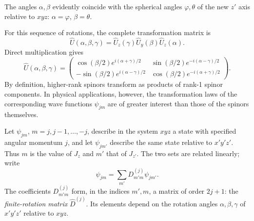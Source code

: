 \begin{figure}[ht]
\par{}
\end{figure}

The angles $\alpha,\beta$ evidently coincide with the spherical angles $\varphi,\theta$ of the new $z'$ axis relative to $xyz$: $\alpha=\varphi$, $\beta=\theta$.

For this sequence of rotations, the complete transformation matrix is
\[
 \hat U(\alpha,\beta,\gamma)=\hat U_z(\gamma)\hat U_y(\beta)\hat U_z(\alpha).
\]
Direct multiplication gives
\begin{equation}
 \hat U(\alpha,\beta,\gamma)=
 \begin{pmatrix}
 \cos(\beta/2)e^{i(\alpha+\gamma)/2}&\sin(\beta/2)e^{-i(\alpha-\gamma)/2}\\
 -\sin(\beta/2)e^{i(\alpha-\gamma)/2}&\cos(\beta/2)e^{-i(\alpha+\gamma)/2}
 \end{pmatrix}.
 \tag{58.6}
\end{equation}
By definition, higher-rank spinors transform as products of rank-1 spinor components. In physical applications, however, the transformation laws of the corresponding wave functions $\psi_{jm}$ are of greater interest than those of the spinors themselves.

Let $\psi_{jm}$, $m=j,j-1,\ldots,-j$, describe in the system $xyz$ a state with specified angular momentum $j$, and let $\psi_{jm'}$ describe the same state relative to $x'y'z'$. Thus $m$ is the value of $J_z$ and $m'$ that of $J_{z'}$. The two sets are related linearly; write
\begin{equation}
 \psi_{jm}=\sum_{m'}D^{(j)}_{m'm}\psi_{jm'}.
 \tag{58.7}
\end{equation}
The coefficients $D^{(j)}_{m'm}$ form, in the indices $m',m$, a matrix of order $2j+1$: the \emph{finite-rotation matrix} $\hat D^{(j)}$. Its elements depend on the rotation angles $\alpha,\beta,\gamma$ of $x'y'z'$ relative to $xyz$.

